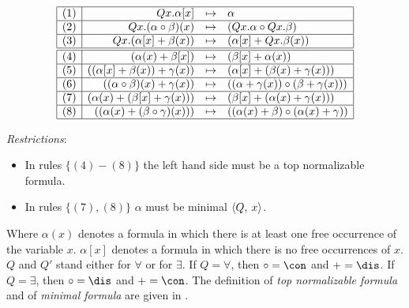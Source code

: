     \renewcommand{\arraystretch}{1.5}
    {\small
      $$
      \begin{array}{|c|rcl|} \hline
        (1) & Q x. \alpha[x] & \mapsto & \alpha \\ \hline
        (2) & Q x. (\alpha \circ \beta)(x) & \mapsto & (Q x. \alpha \circ Q x. \beta) 
        \\ \hline
        (3) & Q x. (\alpha[x] + \beta(x)) & \mapsto & (\alpha[x] + Q x. \beta(x)) 
        \\ \hline \hline
        (4) & (\alpha(x) + \beta[x]) & \mapsto & (\beta[x] + \alpha(x)) \\ \hline
        (5) & ((\alpha[x] + \beta(x)) + \gamma(x)) & \mapsto & 
        (\alpha[x] + (\beta(x) + \gamma(x))) \\ \hline
        (6) & ((\alpha \circ \beta)(x) + \gamma(x)) & \mapsto & 
        ((\alpha + \gamma(x)) \circ (\beta + \gamma(x))) \\ \hline
        (7) & (\alpha(x) + (\beta[x] + \gamma(x))) & \mapsto &
        (\beta[x] + (\alpha(x) + \gamma(x))) \\ \hline
        (8) & ((\alpha(x) + (\beta \circ \gamma)(x))) & \mapsto &
        ((\alpha(x) + \beta) \circ (\alpha(x) + \gamma)) \\ \hline
      \end{array}
      $$
      }
    \renewcommand{\arraystretch}{1}
{\small
{\em Restrictions}: 
\begin{itemize}
\item In rules $\{(4)-(8)\}$ the left hand side must be a top normalizable
formula.
\item In rules $\{(7),(8)\}$ $\alpha$ must be minimal \wrt $\langle Q, \: x \rangle$.
\end{itemize}}

Where
$\alpha(x)$ denotes a formula in which there is at least one free occurrence
of the variable $x$.
$\alpha{[x]}$ denotes a formula in which there is no free occurrences of $x$.
$Q$ and $Q'$ stand either for $\forall$ or for $\exists$.
If $Q = \forall$, then $\circ = \con$ and $+ = \dis$.
If $Q = \exists$, then $\circ = \dis$ and $+ = \con$.
The definition of {\em top normalizable formula} and of {\em minimal
formula} are given in \cite{armando5}.

